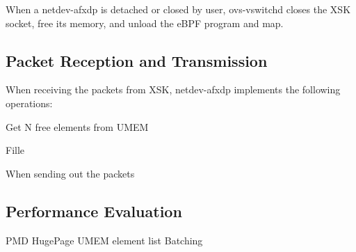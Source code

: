 \documentclass[10pt]{sigplanconf}
\begin{document}
When a netdev-afxdp is detached or closed by user,
ovs-vswitchd closes the XSK socket, free its memory, and unload the eBPF program and map.

\subsection{Packet Reception and Transmission}

When receiving the packets from XSK, netdev-afxdp implements the following
operations:
\begin{enumeration}
\item Get N free elements from UMEM
\item Fille 


\end{enumeration}
When sending out the packets 

\subsection{Performance Evaluation}
PMD
HugePage
UMEM element list
Batching



\end{document}
